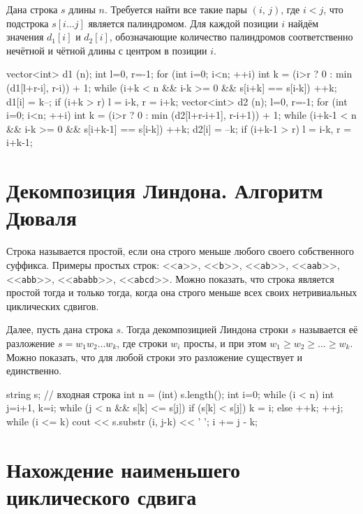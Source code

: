 \documentclass[12pt, titlepage]{article}
\renewcommand{\tt}[1]{\texttt{\small #1}}
\begin{document}
Дана строка $s$ длины $n$. Требуется найти все такие пары $(i,\,j)$, где $i<j$, что подстрока $s[i\ldots j]$ является палиндромом. Для каждой позиции $i$ найдём значения $d_1[i]$ и $d_2[i]$, обозначающие количество палиндромов соответственно нечётной и чётной длины с центром в позиции $i$.

\begin{cppcode}
vector<int> d1 (n);
int l=0, r=-1;
for (int i=0; i<n; ++i) {
    int k = (i>r ? 0 : min (d1[l+r-i], r-i)) + 1;
    while (i+k < n && i-k >= 0 && s[i+k] == s[i-k])  ++k;
    d1[i] = k--;
    if (i+k > r)
        l = i-k,  r = i+k;
}
vector<int> d2 (n);
l=0, r=-1;
for (int i=0; i<n; ++i) {
    int k = (i>r ? 0 : min (d2[l+r-i+1], r-i+1)) + 1;
    while (i+k-1 < n && i-k >= 0 && s[i+k-1] == s[i-k])  ++k;
    d2[i] = --k;
    if (i+k-1 > r)
        l = i-k,  r = i+k-1;
}
\end{cppcode}

\section{Декомпозиция Линдона. Алгоритм Дюваля}

Строка называется простой, если она строго меньше любого своего собственного суффикса. Примеры простых строк: <<\tt{a}>>, <<\tt{b}>>, <<\tt{ab}>>, <<\tt{aab}>>, <<\tt{abb}>>, <<\tt{ababb}>>, <<\tt{abcd}>>. Можно показать, что строка является простой тогда и только тогда, когда она строго меньше всех своих нетривиальных циклических сдвигов.

Далее, пусть дана строка $s$. Тогда декомпозицией Линдона строки $s$ называется её разложение $s=w_1w_2\ldots w_k$, где строки $w_i$ просты, и при этом $w_1 \ge w_2 \ge \ldots \ge w_k$. Можно показать, что для любой строки  это разложение существует и единственно.

\begin{cppcode}
string s; // входная строка
int n = (int) s.length();
int i=0;
while (i < n) {
    int j=i+1, k=i;
    while (j < n && s[k] <= s[j]) {
        if (s[k] < s[j])
            k = i;
        else
            ++k;
        ++j;
    }
    while (i <= k) {
        cout << s.substr (i, j-k) << ' ';
        i += j - k;
    }
}
\end{cppcode}


\section{Нахождение наименьшего циклического сдвига}
\end{document}
